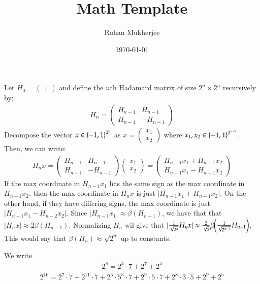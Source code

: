 \documentclass[12pt]{article}
\title{Math Template}
\date{\today}
\author{Rohan Mukherjee}
\theoremstyle{definitionstyle}
\newcommand{\SET}[1]{\Set{\mskip-\medmuskip #1 \mskip-\medmuskip}}
\begin{document}
    \maketitle
    Let $H_0 = \begin{pmatrix} 1 \end{pmatrix}$ and define the $n$th Hadamard matrix of size $2^n \times 2^n$ recursively by:
    \begin{align*}
        H_n = \begin{pmatrix} H_{n-1} & H_{n-1} \\ H_{n-1} & -H_{n-1} \end{pmatrix}
    \end{align*}
    Decompose the vector $x \in \SET{-1, 1}^{2^n}$ as $x = \begin{pmatrix} x_1 \\ x_2 \end{pmatrix}$ where $x_1, x_2 \in \SET{-1, 1}^{2^{n-1}}$. Then, we can write:
    \begin{align*}
        H_n x = \begin{pmatrix} H_{n-1} & H_{n-1} \\ H_{n-1} & -H_{n-1} \end{pmatrix} \begin{pmatrix} x_1 \\ x_2 \end{pmatrix} = \begin{pmatrix} H_{n-1} x_1 + H_{n-1} x_2 \\ H_{n-1} x_1 - H_{n-1} x_2 \end{pmatrix}
    \end{align*}
    If the max coordinate in $H_{n-1}x_1$ has the same sign as the max coordinate in $H_{n-1}x_2$, then the max coordinate in $H_n x$ is just $|H_{n-1}x_1 + H_{n-1}x_2|$. On the other hand, if they have differing signs, the max coordinate is just $|H_{n-1}x_1 - H_{n-2}x_2|$. Since $|H_{n-1}x_1| \approx \beta(H_{n-1})$, we have that that $|H_{n} x| \approx 2\beta(H_{n-1})$. Normalizing $H_{n}$ wil give that $|\frac{1}{\sqrt{2^{n}}} H_{n}x| \approx \frac{2}{\sqrt{2}} \beta\qty(\frac{1}{\sqrt{2^{n-1}}} H_{n-1})$. This would say that $\beta(H_n) \approx \sqrt{2^n}$ up to constants.

    We write
    \begin{align*}
        2^8 = 2^4 \cdot 7 + 2^7 + 2^4
    \end{align*}
    \begin{align*}
        2^{16} = 2^7 \cdot 7 + 2^{11} \cdot 7 + 2^5 \cdot 5^3 \cdot 7 + 2^9 \cdot 5 \cdot 7 + 2^8 \cdot 3 \cdot 5 + 2^9 + 2^5
    \end{align*}
\end{document}

